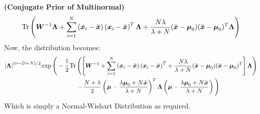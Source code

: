 \begin{remark}{\textbf{(Conjugate Prior of Multinormal)}}
    \begin{equation*}
        \operatorname{Tr}\left( \boldsymbol W^{-1}\boldsymbol \Lambda  + \sum^N_{i=1}\left( \boldsymbol x_i - \bar{\boldsymbol x} \right)\left( \boldsymbol x_i - \bar{\boldsymbol x} \right)^T\boldsymbol\Lambda + \frac{N\lambda}{\lambda + N}(\bar{\boldsymbol x} - \boldsymbol \mu_0)(\bar{\boldsymbol x} - \boldsymbol \mu_0)^T\boldsymbol\Lambda \right)
    \end{equation*}
    Now, the distribution becomes:
    \begin{equation*}
    \begin{aligned}
        \left| \boldsymbol \Lambda \right|^{(\nu-D + N)/2}\exp\Bigg(-\cfrac{1}{2}
            \operatorname{Tr}&\left( \left[ \boldsymbol W^{-1}  + \sum^N_{i=1}\left( \boldsymbol x_i - \bar{\boldsymbol x} \right)\left( \boldsymbol x_i - \bar{\boldsymbol x} \right)^T + \frac{N\lambda}{\lambda + N}(\bar{\boldsymbol x} - \boldsymbol \mu_0)(\bar{\boldsymbol x} - \boldsymbol \mu_0)^T \right]\boldsymbol\Lambda \right) \\ 
        &- \frac{N+\lambda}{2} \left( \boldsymbol \mu - \frac{\lambda\boldsymbol \mu_0 + N\bar{\boldsymbol x}}{\lambda+N} \right)^T\boldsymbol\Lambda\left( \boldsymbol \mu - \frac{\lambda\boldsymbol \mu_0 + N\bar{\boldsymbol x}}{\lambda+N} \right) \Bigg) \\
    \end{aligned}
    \end{equation*}
    Which is simply a Normal-Wishart Distribution as required.
\end{remark}

